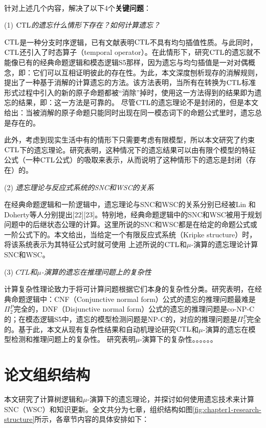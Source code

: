 ~\\
针对上述几个内容，解决了以下4个\textbf{关键问题}：

(1) {\em $\textrm{CTL}$的遗忘什么情形下存在？如何计算遗忘？}

$\textrm{CTL}$是一种分支时序逻辑，已有文献表明$\textrm{CTL}$不具有均匀插值性质。与此同时，$\textrm{CTL}$还引入了时态算子（temporal operator）。在此情形下，研究$\textrm{CTL}$的遗忘就不能像已有的经典命题逻辑和模态逻辑S5那样，因为遗忘与均匀插值是一对对偶概念，即：它们可以互相证明彼此的存在性。为此，本文深度刨析现存的消解规则，提出了一种基于消解的计算遗忘的方法。该方法表明，当所有在转换为$\textrm{CTL}$标准形式过程中引入的新的原子命题都被“消除”掉时，使用这一方法得到的结果即为遗忘的结果，即：这一方法是可靠的。
尽管$\textrm{CTL}$的遗忘理论不是封闭的，但是本文给出：当被消解的原子命题只能同时出现在同一模态词下的命题公式里时，遗忘总是存在的。

此外，考虑到现实生活中有的情形下只需要考虑有限模型，所以本文研究了约束$\textrm{CTL}$下的遗忘理论。研究表明，这种情况下的遗忘结果可以由有限个模型的特征公式（一种$\textrm{CTL}$公式）的吸取来表示，从而说明了这种情形下的遗忘是封闭（存在）的。

(2) {\em 遗忘理论与反应式系统的SNC和WSC的关系}

在经典命题逻辑和一阶逻辑中，遗忘理论与SNC和WSC的关系分别已经被Lin 和 Doherty等人分别提出[22][23]。特别地，经典命题逻辑中的SNC和WSC被用于规划问题中的后继状态公理的计算。这里所说的SNC和WSC都是在给定的命题公式或一阶公式下的。本文给出，当给定一个有限反应式系统（Kripke structure）时，将该系统表示为其特征公式时就可使用
上述所说的$\textrm{CTL}$和$\mu$-演算的遗忘理论计算SNC和WSC。



(3) {\em $CTL$和$\mu$-演算的遗忘在推理问题上的复杂性}

计算复杂性理论致力于将可计算问题根据它们本身的复杂性分类。研究表明，在经典命题逻辑中：CNF（Conjunctive normal form）公式的遗忘的推理问题最难是$\Pi_2^P$完全的，DNF（Disjunctive normal form）公式的遗忘的推理问题是co-NP-C的；在模态逻辑S5中，遗忘的模型检测问题是NP-C的，对应的推理问题是$\Pi_2^P$完全的。基于此，本文从现有复杂性结果和自动机理论研究$\textrm{CTL}$和$\mu$-演算的遗忘在模型检测和推理问题上的复杂性。
研究表明$\mu$-演算下的复杂性。。。。。。








\section{论文组织结构}
本文研究了计算树逻辑和$\mu$-演算下的遗忘理论，并探讨如何使用遗忘技术来计算SNC（WSC）和知识更新。全文共分为七章，组织结构如图\ref{fig:chapter1-research-structure}所示，各章节内容的具体安排如下：


